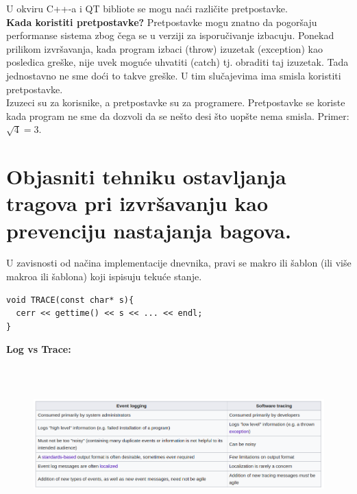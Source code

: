 \documentclass[a4paper]{article}
\begin{document}
  \noindent U okviru C++-a i QT bibliote se mogu naći različite pretpostavke.\\

  \textbf{Kada koristiti pretpostavke?} Pretpostavke mogu znatno da pogoršaju performanse
  sistema zbog čega se u verziji za isporučivanje izbacuju. Ponekad prilikom izvršavanja, kada program  
  izbaci (throw) izuzetak (exception) kao posledica greške, nije uvek moguće uhvatiti (catch) tj. 
  obraditi taj izuzetak. Tada jednostavno ne sme doći to takve greške. U tim slučajevima ima smisla 
  koristiti pretpostavke.\\
  \indent Izuzeci su za korisnike, a pretpostavke su za programere. Pretpostavke se koriste
  kada program ne sme da dozvoli da se nešto desi što uopšte nema smisla. Primer: $\sqrt{4}=3$.

\section{Objasniti tehniku ostavljanja tragova pri izvršavanju kao prevenciju nastajanja bagova.}
  U zavisnosti od načina implementacije dnevnika, pravi se makro ili šablon (ili više makroa
  ili šablona) koji ispisuju tekuće stanje. 

\begin{lstlisting}
void TRACE(const char* s){
  cerr << gettime() << s << ... << endl;
}
\end{lstlisting}
  \textbf{Log vs Trace:}
  \begin{figure}[H]
    \begin{center}
        \includegraphics[width=120mm,height=60mm]{Slike/log_vs_trace.png}
    \end{center}
  \end{figure}
\end{document}

